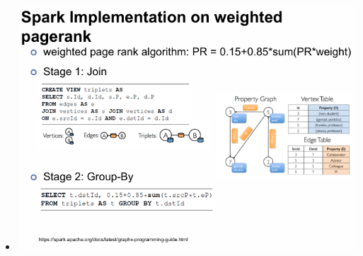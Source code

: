 \documentclass[10pt, landscape]{article}
\begin{document}
\begin{multicols*}{4}
\begin{itemize}
      \item \includegraphics*[width=0.95\linewidth]{spark_pagerank.png}
  \end{itemize}

\end{multicols*}
\end{document}
